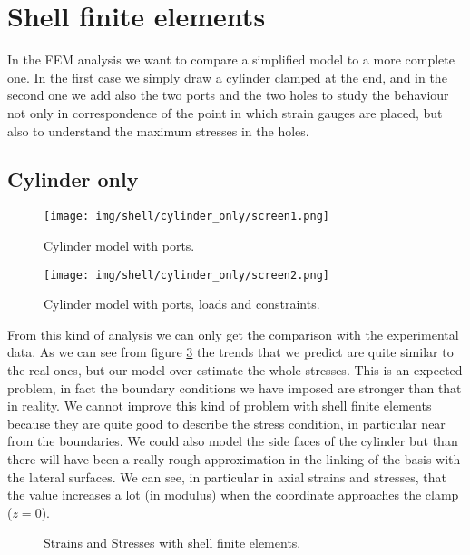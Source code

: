 \documentclass[a4paper,12pt]{article}
\begin{document}
\section{Shell finite elements}
In the FEM analysis we want to compare a simplified model to a more complete one. In the first case we simply draw a cylinder clamped at the end, and in the second one we add also the two ports and the two holes to study the behaviour not only in correspondence of the point in which strain gauges are placed, but also to understand the maximum stresses in the holes.
\subsection*{Cylinder only}

\begin{figure}[H]
\centering
\texttt{[image: img/shell/cylinder\_only/screen1.png]}
\caption{Cylinder model with ports.}
\label{fig:shell_cylinder_only_screen1}
\end{figure}

\begin{figure}[H]
\centering
\texttt{[image: img/shell/cylinder\_only/screen2.png]}
\caption{Cylinder model with ports, loads and constraints.}
\label{fig:shell_cylinder_only_screen2}
\end{figure}

From this kind of analysis we can only get the comparison with the experimental data. As we can see from figure \ref{fig:shellmodel1} the trends that we predict are quite similar to the real ones, but our model over estimate the whole stresses. 
This is an expected problem, in fact the boundary conditions we have imposed are stronger than that in reality. We cannot improve this kind of problem with shell finite elements because they are quite good to describe the stress condition, in particular near from the boundaries. We could also model the side faces of the cylinder but than there will have been a really rough approximation in the linking of the basis with the lateral surfaces. 
We can see, in particular in axial strains and stresses, that the value increases a lot (in modulus) when the coordinate approaches the clamp ($z = 0$).

\begin{figure}[h]
\centering     %
\caption{Strains and Stresses with shell finite elements.}
\label{fig:shellmodel1}
\end{figure}
\end{document}
